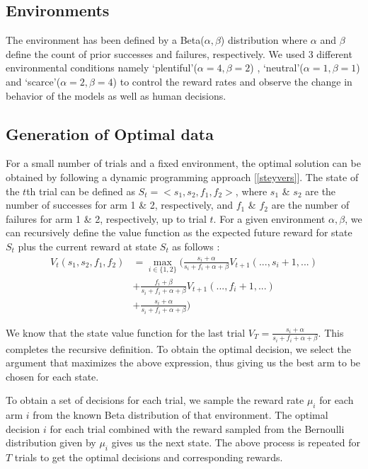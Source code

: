 \label{design}

\subsection{Environments}
The environment has been defined by a Beta($\alpha,\beta$) distribution where $\alpha$ and $\beta$ define the count of prior successes and failures, respectively. We used 3 different environmental conditions namely ‘plentiful’($\alpha=4,\beta=2$) , ‘neutral’($\alpha=1,\beta=1$) and ‘scarce’($\alpha=2,\beta=4$) to control the reward rates and observe the change in behavior of the models as well as human decisions.

\subsection{Generation of Optimal data}
For a small number of trials and a fixed environment, the optimal solution can be obtained by following a dynamic programming approach [\ref{steyvers}]. The state of the $t$th trial can be defined as $S_t = <s_1,s_2,f_1,f_2>$, where $s_1$ \& $s_2$ are the number of successes for arm 1 \& 2, respectively, and $f_1$ \& $f_2$ are the number of failures for arm 1 \& 2, respectively, up to trial $t$. For a given environment $\alpha,\beta$, we can recursively define the value function as the expected future reward for state $S_t$ plus the current reward at state $S_t$ as follows : 
\begin{align*}
\label{eq:recDef}
	V_t(s_1,s_2,f_1,f_2) &= \max_{i \in \{1,2\}} 
	\Big(
	\frac{s_i + \alpha}{s_i + f_i + \alpha + \beta} V_{t+1}(...,s_i+1,...) \\
	&+ \frac{f_i + \beta}{s_i + f_i + \alpha + \beta} V_{t+1}(...,f_i+1,...)\\
	&+ \frac{s_i + \alpha}{s_i + f_i + \alpha + \beta} 
	\Big)	
\end{align*}


We know that the state value function for the last trial $V_T=\frac{s_i + \alpha}{s_i + f_i + \alpha + \beta}$. This completes the recursive definition. To obtain the optimal decision, we select the argument that maximizes the above expression, thus giving us the best arm to be chosen for each state. 

To obtain a set of decisions for each trial, we sample the reward rate $\mu_i$ for each arm $i$ from the known Beta distribution of that environment. The optimal decision $i$ for each trial combined with the reward sampled from the Bernoulli distribution given by $\mu_i$ gives us the next state. The above process is repeated for $T$ trials to get the optimal decisions and corresponding rewards.

